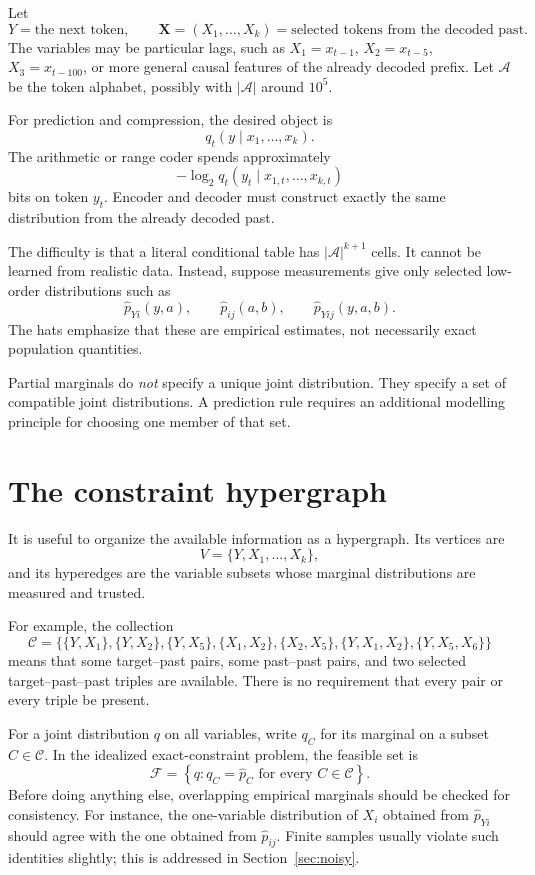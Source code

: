 \documentclass[11pt]{article}
\newcommand{\X}{\mathbf X}
\newcommand{\1}{\mathbf 1}
\newcommand{\mcC}{\mathcal C}
\newcommand{\mcA}{\mathcal A}
\newcommand{\hatp}{\widehat p}
\begin{document}
Let
\[
  Y = \text{the next token},\qquad
  \X=(X_1,\ldots,X_k)=\text{selected tokens from the decoded past}.
\]
The variables may be particular lags, such as
\(X_1=x_{t-1}\), \(X_2=x_{t-5}\), \(X_3=x_{t-100}\), or more general
causal features of the already decoded prefix.  Let \(\mcA\) be the token
alphabet, possibly with \(\lvert\mcA\rvert\) around \(10^5\).

For prediction and compression, the desired object is
\[
  q_t(y\mid x_1,\ldots,x_k).
\]
The arithmetic or range coder spends approximately
\[
  -\log_2 q_t(y_t\mid x_{1,t},\ldots,x_{k,t})
\]
bits on token \(y_t\).  Encoder and decoder must construct exactly the same
distribution from the already decoded past.

The difficulty is that a literal conditional table has
\(\lvert\mcA\rvert^{k+1}\) cells.  It cannot be learned from realistic data.
Instead, suppose measurements give only selected low-order distributions such
as
\[
  \hatp_{Yi}(y,a),\qquad
  \hatp_{ij}(a,b),\qquad
  \hatp_{Yij}(y,a,b).
\]
The hats emphasize that these are empirical estimates, not necessarily exact
population quantities.

\begin{keyidea}
Partial marginals do \emph{not} specify a unique joint distribution.  They
specify a set of compatible joint distributions.  A prediction rule requires
an additional modelling principle for choosing one member of that set.
\end{keyidea}

\section{The constraint hypergraph}

It is useful to organize the available information as a hypergraph.  Its
vertices are
\[
  V=\{Y,X_1,\ldots,X_k\},
\]
and its hyperedges are the variable subsets whose marginal distributions are
measured and trusted.

For example, the collection
\[
  \mcC=
  \bigl\{
    \{Y,X_1\},\{Y,X_2\},\{Y,X_5\},
    \{X_1,X_2\},\{X_2,X_5\},
    \{Y,X_1,X_2\},\{Y,X_5,X_6\}
  \bigr\}
\]
means that some target--past pairs, some past--past pairs, and two selected
target--past--past triples are available.  There is no requirement that every
pair or every triple be present.

For a joint distribution \(q\) on all variables, write \(q_C\) for its marginal
on a subset \(C\in\mcC\).  In the idealized exact-constraint problem, the
feasible set is
\[
  \mathcal F
  =
  \left\{
  q:
  q_C=\hatp_C \text{ for every } C\in\mcC
  \right\}.
\]
Before doing anything else, overlapping empirical marginals should be checked
for consistency.  For instance, the one-variable distribution of \(X_i\)
obtained from \(\hatp_{Yi}\) should agree with the one obtained from
\(\hatp_{ij}\).  Finite samples usually violate such identities slightly; this
is addressed in Section~\ref{sec:noisy}.
\end{document}
